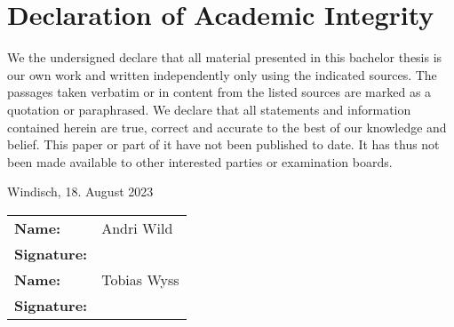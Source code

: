 \chapter{Declaration of Academic Integrity}
We the undersigned declare that all material presented in this bachelor thesis 
is our own work and written independently only using the indicated sources. 
The passages taken verbatim or in content from the listed sources are marked 
as a quotation or paraphrased. We declare that all statements and information contained
herein are true, correct and accurate to the best of our knowledge and
belief. This paper or part of it have not been published to date. It has thus
not been made available to other interested parties or examination boards.

\vspace*{4ex}

Windisch, 18. August 2023

\vspace*{4ex}

\renewcommand{\arraystretch}{2.5}
\begin{tabular}{@{}>{\bfseries}ll}
Name: & Andri Wild\\
Signature: & \\[6ex]
Name: & Tobias Wyss\\
Signature: & \\
\end{tabular}
